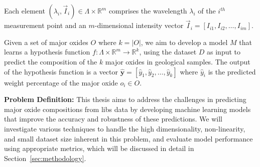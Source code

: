 Each element $(\lambda_i, \vec{I}_i) \in \Lambda \times \mathbb{R}^{m}$ comprises the wavelength $\lambda_i$ of the $i^{th}$ measurement point and an $m$-dimensional intensity vector $\vec{I}_i = [I_{i1}, I_{i2}, \ldots, I_{im}]$.

Given a set of major oxides $O$ where $k=|O|$, we aim to develop a model $M$ that learns a hypothesis function $f: \Lambda \times \mathbb{R}^m \rightarrow \mathbb{R}^k$, using the dataset $D$ as input to predict the composition of the $k$ major oxides in geological samples.
The output of the hypothesis function is a vector $\mathbf{\hat{y}} = [\hat{y}_{1}, \hat{y}_{2}, \ldots, \hat{y}_{k}]$ where $\hat{y}_{i}$ is the predicted weight percentage of the major oxide $o_i \in O$.

\textbf{Problem Definition:} This thesis aims to address the challenges in predicting major oxide compositions from \gls{libs} data by developing machine learning models that improve the accuracy and robustness of these predictions. 
We will investigate various techniques to handle the high dimensionality, non-linearity, and small dataset size inherent in this problem, and evaluate model performance using appropriate metrics, which will be discussed in detail in Section~\ref{sec:methodology}.
